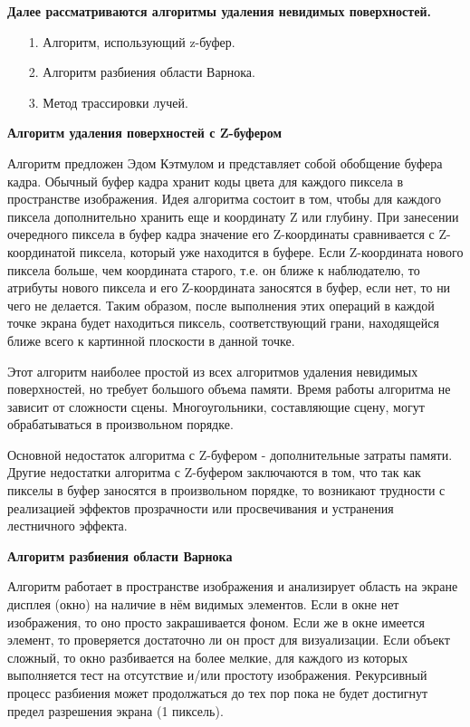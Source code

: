 \textbf{Далее рассматриваются алгоритмы удаления невидимых поверхностей. } \cite{deletenovisible}

\begin{enumerate}
	\item[1. ] Алгоритм, использующий z-буфер. 
	\item[2. ] Алгоритм разбиения области Варнока. 
	\item[3. ] Метод трассировки лучей. 
\end{enumerate}

\textbf{Алгоритм удаления поверхностей с Z-буфером }

Алгоритм предложен Эдом Кэтмулом и представляет собой обобщение буфера кадра. Обычный буфер кадра хранит коды цвета для каждого пиксела в пространстве изображения. Идея алгоритма состоит в том, чтобы для каждого пиксела дополнительно хранить еще и координату Z или глубину. При занесении очередного пиксела в буфер кадра значение его Z-координаты сравнивается с Z-координатой пиксела, который уже находится в буфере. Если Z-координата нового пиксела больше, чем координата старого, т.е. он ближе к наблюдателю, то атрибуты нового пиксела и его Z-координата заносятся в буфер, если нет, то ни чего не делается. Таким образом, после выполнения этих операций в каждой точке экрана будет находиться пиксель, соответствующий грани, находящейся ближе всего к картинной плоскости в данной точке.

Этот алгоритм наиболее простой из всех алгоритмов удаления невидимых поверхностей, но требует большого объема памяти. Время работы алгоритма не зависит от сложности сцены. Многоугольники, составляющие сцену, могут обрабатываться в произвольном порядке. 

Основной недостаток алгоритма с Z-буфером - дополнительные затраты памяти. Другие недостатки алгоритма с Z-буфером заключаются в том, что так как пикселы в буфер заносятся в произвольном порядке, то возникают трудности с реализацией эффектов прозрачности или просвечивания и устранения лестничного эффекта. 

\textbf{Алгоритм разбиения области Варнока }

Алгоритм работает в пространстве изображения и анализирует область на экране дисплея (окно) на наличие в нём видимых элементов. Если в окне нет изображения, то оно просто закрашивается фоном. Если же в окне имеется элемент, то проверяется достаточно ли он прост для визуализации. Если объект сложный, то окно разбивается на более мелкие, для каждого из которых выполняется тест на отсутствие и/или простоту изображения. Рекурсивный процесс разбиения может продолжаться до тех пор пока не будет достигнут предел разрешения экрана (1 пиксель).

